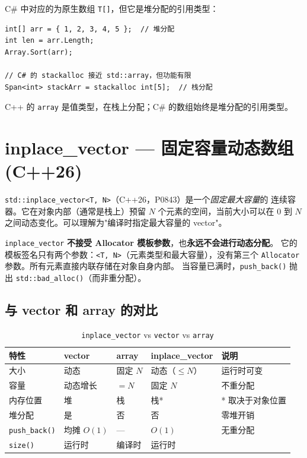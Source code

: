 \documentclass[12pt,a4paper,fontset=fandol]{ctexbook}
\newcommand{\cpp}[1]{C++#1}
\newcommand{\Fn}[1]{\texttt{#1()}}
\newcommand{\Tp}[1]{\texttt{#1}}
\begin{document}
\begin{compare}
C\# 中对应的为原生数组 \texttt{T[]}，但它是堆分配的引用类型：
\begin{lstlisting}[style=csharpstyle]
int[] arr = { 1, 2, 3, 4, 5 };  // 堆分配
int len = arr.Length;
Array.Sort(arr);

// C# 的 stackalloc 接近 std::array，但功能有限
Span<int> stackArr = stackalloc int[5];  // 栈分配
\end{lstlisting}
C++ 的 \texttt{array} 是值类型，在栈上分配；C\# 的数组始终是堆分配的引用类型。
\end{compare}

\chapter{inplace\_vector --- 固定容量动态数组 (C++26)}

\Tp{std::inplace\_vector<T, N>}（\cpp{26}，P0843）是一个\emph{固定最大容量}的
连续容器。它在对象内部（通常是栈上）预留 $N$ 个元素的空间，当前大小可以在
$0$ 到 $N$ 之间动态变化。可以理解为"编译时指定最大容量的 vector"。

\begin{warning}
\texttt{inplace\_vector} \textbf{不接受 Allocator 模板参数}，也\textbf{永远不会进行动态分配}。
它的模板签名只有两个参数：\texttt{<T, N>}（元素类型和最大容量），没有第三个
\texttt{Allocator} 参数。所有元素直接内联存储在对象自身内部。
当容量已满时，\Fn{push\_back} 抛出 \Fn{std::bad\_alloc}（而非重分配）。
\end{warning}

\section{与 vector 和 array 的对比}

\begin{table}[htbp]
\centering
\caption{\Tp{inplace\_vector} vs \Tp{vector} vs \Tp{array}}
\begin{tabularx}{\textwidth}{l l l l X}
\toprule
\textbf{特性} & \textbf{vector} & \textbf{array} & \textbf{inplace\_vector} & \textbf{说明} \\
\midrule
大小       & 动态 & 固定 $N$ & 动态（$\leq N$） & 运行时可变 \\
容量       & 动态增长 & $= N$ & 固定 $N$ & 不重分配 \\
内存位置   & 堆 & 栈 & 栈* & * 取决于对象位置 \\
堆分配     & 是 & 否 & 否 & 零堆开销 \\
\Fn{push\_back} & 均摊 $O(1)$ & --- & $O(1)$ & 无重分配 \\
\Fn{size}  & 运行时 & 编译时 & 运行时 & \\
\bottomrule
\end{tabularx}
\end{table}
\end{document}
